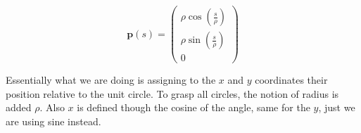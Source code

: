 \[
\mathbf{p}(s) = 
\begin{pmatrix}
    \rho \cos \left(\frac{s}{\rho}\right) \\
    \rho \sin \left(\frac{s}{\rho}\right) \\
    0
\end{pmatrix}
\]

Essentially what we are doing is assigning to the $x$ and $y$ coordinates their position relative to the unit circle. To grasp all circles, the notion of radius is added $\rho$. Also $x$ is defined though the cosine of the angle, same for the $y$, just we are using sine instead. 












